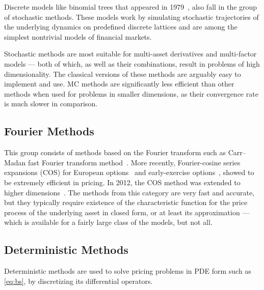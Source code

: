 \documentclass{UUThesisTemplate}
\begin{document}
\par
Discrete models like binomial trees that appeared in 1979~\cite{cox1979option, rendleman1979two}, also fall in the group of stochastic methods. These models work by simulating stochastic trajectories of the underlying dynamics on predefined discrete lattices and are among the simplest nontrivial models of financial markets. 

\par
Stochastic methods are most suitable for multi-asset derivatives and multi-factor models --- both of which, as well as their combinations, result in problems of high dimensionality. The classical versions of these methods are arguably easy to implement and use. MC methods are significantly less efficient than other methods when used for problems in smaller dimensions, as their convergence rate is much slower in comparison.
%



%
\subsection{Fourier Methods}

\par
This group consists of methods based on the Fourier transform such as Carr--Madan fast Fourier transform method~\cite{carr1999option}. More recently, Fourier-cosine series expansions (COS) for European options~\cite{fang2008novel} and early-exercise options~\cite{fang2009pricing}, showed to be extremely efficient in pricing. In 2012, the COS method was extended to higher dimensions~\cite{ruijter2012two}. The methods from this category are very fast and accurate, but they typically require existence of the characteristic function for the price process of the underlying asset in closed form, or at least its approximation --- which is available for a fairly large class of the models, but not all. 
%



%
\subsection{Deterministic Methods}

\par
Deterministic methods are used to solve pricing problems in PDE form such as \eqref{eq:bs}, by discretizing its differential operators. 
\end{document}
